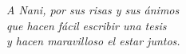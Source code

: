 \thispagestyle{empty}
\section*{}
\vspace{5cm}
\begin{flushright}
  \textit{
  A Nani, por sus risas y sus \'{a}nimos \\
  \vspace{0.1cm}
  que hacen f\'{a}cil escribir una tesis \\
  \vspace{0.1cm}
  y hacen maravilloso el estar juntos.
}
  \end{flushright}


\vfill

